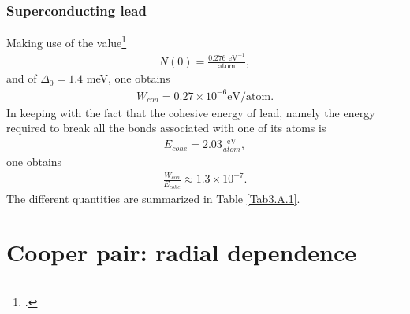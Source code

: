 \subsubsection{Superconducting lead}
Making use of the value\footnote{\cite{Beck:70}.}
\begin{align}\label{eqC3AppA5}
N(0)=\frac{0.276\text{ eV}^{-1}}{\text{atom}},
\end{align}
and of $\Delta_0=1.4$ meV, one obtains
\begin{align}\label{eqC3AppA6}
W_{con}=0.27\times10^{-6}\text{eV/atom}.
\end{align}
In keeping with the fact that the cohesive energy of lead, namely the energy required to break all the bonds associated with one of its atoms is
\begin{align}\label{eqC3AppA7}
E_{cohe}=2.03\frac{\text{eV}}{{atom}},
\end{align}
one obtains
\begin{align}\label{eqC3AppA8}
\frac{W_{con}}{E_{cohe}}\approx1.3\times10^{-7}.
\end{align}
The different quantities are summarized in Table \ref{Tab3.A.1}.
\section{Cooper pair: radial dependence}\label{App3B}

